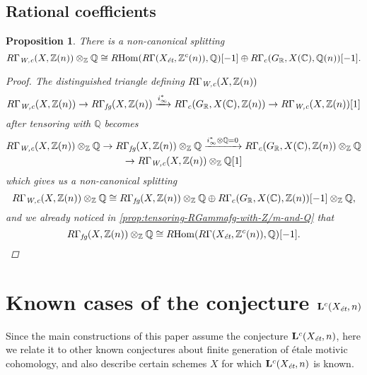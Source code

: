\documentclass[draft,leqno,12pt]{article}
\theoremstyle{plain}
\newtheorem{proposition}[theorem]{\indent\sc Proposition}
\theoremstyle{definition}
\DeclareMathOperator{\Hom}{Hom}
\newcommand{\ZZ}{\mathbb{Z}}
\newcommand{\QQ}{\mathbb{Q}}
\newcommand{\RR}{\mathbb{R}}
\newcommand{\CC}{\mathbb{C}}
\newcommand{\Wc}{\text{\it W,c}}
\newcommand{\et}{\text{\it \'{e}t}}
\newcommand{\fg}{\text{\it fg}}
\newcommand{\RHom}{R\!\Hom}
\begin{document}
\subsection*{Rational coefficients}

\begin{proposition}
  There is a non-canonical splitting
  \[ R\Gamma_\Wc (X, \ZZ(n)) \otimes_\ZZ \QQ \cong
    \RHom (R\Gamma (X_\et, \ZZ^c (n)), \QQ) [-1] \oplus
    R\Gamma_c (G_\RR, X (\CC), \QQ (n)) [-1]. \]

  \begin{proof}
    The distinguished triangle defining $R\Gamma_\Wc (X, \ZZ(n))$
    \[ R\Gamma_\Wc (X, \ZZ (n)) \to
      R\Gamma_\fg (X, \ZZ(n)) \xrightarrow{i_\infty^*}
      R\Gamma_c (G_\RR, X (\CC), \ZZ(n)) \to
      R\Gamma_\Wc (X, \ZZ (n)) [1] \]
    after tensoring with $\QQ$ becomes
    \begin{multline*}
      R\Gamma_\Wc (X, \ZZ (n))\otimes_\ZZ \QQ \to
      R\Gamma_\fg (X, \ZZ(n))\otimes_\ZZ \QQ \xrightarrow{i_\infty^*\otimes\QQ = 0}
      R\Gamma_c (G_\RR, X (\CC), \ZZ(n))\otimes_\ZZ \QQ \\
      \to R\Gamma_\Wc (X, \ZZ (n))\otimes_\ZZ \QQ [1]
    \end{multline*}
    which gives us a non-canonical splitting \cite[Chapitre~II,
    Corollaire~1.2.6]{Verdier-thesis}
    \[ R\Gamma_\Wc (X, \ZZ (n))\otimes_\ZZ \QQ \cong
      R\Gamma_\fg (X, \ZZ(n))\otimes_\ZZ \QQ \oplus
      R\Gamma_c (G_\RR, X (\CC), \ZZ(n)) [-1]\otimes_\ZZ \QQ, \]
    and we already noticed in \ref{prop:tensoring-RGammafg-with-Z/m-and-Q} that
    \[ R\Gamma_\fg (X, \ZZ (n)) \otimes_\ZZ \QQ \cong
      \RHom (R\Gamma (X_\et, \ZZ^c (n)), \QQ) [-1]. \qedhere \]
  \end{proof}
\end{proposition}


\section{Known cases of the conjecture $\mathbf{L}^c (X_\et,n)$}
\label{sec:known-cases-of-Lc-Xet-n}

Since the main constructions of this paper assume the conjecture
$\mathbf{L}^c (X_\et,n)$, here we relate it to other known conjectures about
finite generation of \'{e}tale motivic cohomology, and also describe certain schemes
$X$ for which $\mathbf{L}^c (X_\et,n)$ is known.
\end{document}
